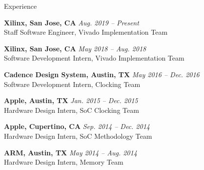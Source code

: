 
\begin{rSection}{Experience}


{\bf Xilinx, San Jose, CA} \hfill {\em Aug. 2019 -- Present} \\
Staff Software Engineer, Vivado Implementation Team

{\bf Xilinx, San Jose, CA} \hfill {\em May 2018 -- Aug. 2018} \\
Software Development Intern, Vivado Implementation Team
    
{\bf Cadence Design System, Austin, TX} \hfill {\em May 2016 -- Dec. 2016} \\
Software Development Intern, Clocking Team

{\bf Apple, Austin, TX} \hfill {\em Jan. 2015 -- Dec. 2015} \\
Hardware Design Intern, SoC Clocking Team

{\bf Apple, Cupertino, CA} \hfill {\em Sep. 2014 -- Dec. 2014} \\
Hardware Design Intern, SoC Methodology Team

{\bf ARM, Austin, TX} \hfill {\em May 2014 -- Aug. 2014} \\
Hardware Design Intern, Memory Team


\end{rSection}


